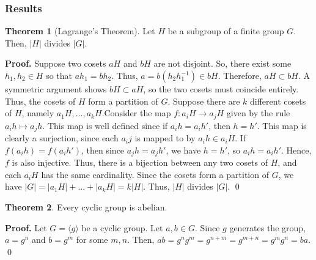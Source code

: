 \documentclass{article}
\theoremstyle{definition}
\newtheorem{theorem}{Theorem}[subsection]
\begin{document}
\subsubsection{Results}
\begin{theorem}[Lagrange's Theorem]
    Let $H$ be a subgroup of a finite group $G$. Then, $|H|$ divides $|G|$.
\end{theorem}
\noindent
\textbf{Proof.} 
Suppose two cosets $aH$ and $bH$ are not disjoint. So, there exist some $h_1,h_2\in H$ so that $ah_1=bh_2$. Thus, $a=b(h_2h_1^{-1})\in bH$. Therefore, $aH\subset bH$. A symmetric argument shows $bH\subset aH$, so the two cosets must coincide entirely. Thus, the cosets of $H$ form a partition of $G$. 
\newline
\newline
Suppose there are $k$ different cosets of $H$, namely $a_1H,...,a_kH$.Consider the map $f:a_iH\rightarrow a_jH$ given by the rule $a_ih\mapsto a_jh$. This map is well defined since if $a_ih=a_ih'$, then $h=h'$. This map is clearly a surjection, since each $a_ij$ is mapped to by $a_ih\in a_iH$. If $f(a_ih)=f(a_ih')$, then since $a_jh=a_jh'$, we have $h=h'$, so $a_ih=a_ih'$. Hence, $f$ is also injective. Thus, there is a bijection between any two cosets of $H$, and each $a_iH$ has the same cardinality. 
\newline
\newline
Since the cosets form a partition of $G$, we have $|G|=|a_1H|+...+|a_kH|=k|H|$. Thus, $|H|$ divides $|G|$. \qed

\begin{theorem}
    Every cyclic group is abelian.
\end{theorem}
\textbf{Proof.} Let $G=\langle g\rangle$ be a cyclic group. Let $a,b\in G$. Since $g$ generates the group, $a=g^n$ and $b=g^m$ for some $m,n$. Then, $ab=g^ng^m=g^{n+m}=g^{m+n}=g^mg^n=ba$. \qed
\end{document}
